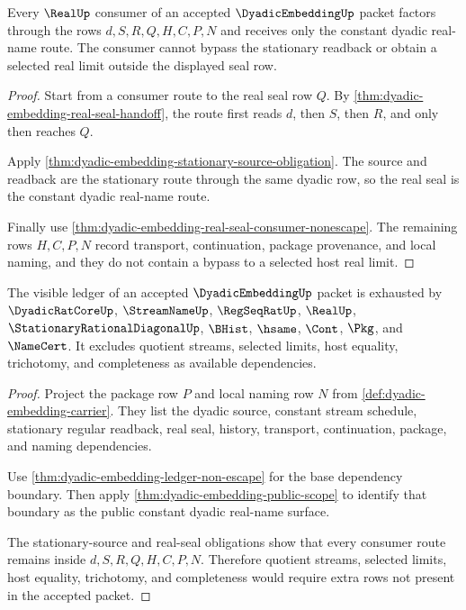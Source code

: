 \begin{theorem}
\label{thm:dyadic-embedding-real-seal-obligation}
Every $\RealUp$ consumer of an accepted $\DyadicEmbeddingUp$ packet factors through the rows $d,S,R,Q,H,C,P,N$ and receives only the constant dyadic real-name route. The consumer cannot bypass the stationary readback or obtain a selected real limit outside the displayed seal row.
\end{theorem}
\begin{proof}
Start from a consumer route to the real seal row $Q$. By \autoref{thm:dyadic-embedding-real-seal-handoff}, the route first reads $d$, then $S$, then $R$, and only then reaches $Q$.

Apply \autoref{thm:dyadic-embedding-stationary-source-obligation}. The source and readback are the stationary route through the same dyadic row, so the real seal is the constant dyadic real-name route.

Finally use \autoref{thm:dyadic-embedding-real-seal-consumer-nonescape}. The remaining rows $H,C,P,N$ record transport, continuation, package provenance, and local naming, and they do not contain a bypass to a selected host real limit.
\end{proof}

\begin{theorem}
\label{thm:dyadic-embedding-ledger-exactness-obligation}
The visible ledger of an accepted $\DyadicEmbeddingUp$ packet is exhausted by $\DyadicRatCoreUp$, $\StreamNameUp$, $\RegSeqRatUp$, $\RealUp$, $\StationaryRationalDiagonalUp$, $\BHist$, $\hsame$, $\Cont$, $\Pkg$, and $\NameCert$. It excludes quotient streams, selected limits, host equality, trichotomy, and completeness as available dependencies.
\end{theorem}
\begin{proof}
Project the package row $P$ and local naming row $N$ from \autoref{def:dyadic-embedding-carrier}. They list the dyadic source, constant stream schedule, stationary regular readback, real seal, history, transport, continuation, package, and naming dependencies.

Use \autoref{thm:dyadic-embedding-ledger-non-escape} for the base dependency boundary. Then apply \autoref{thm:dyadic-embedding-public-scope} to identify that boundary as the public constant dyadic real-name surface.

The stationary-source and real-seal obligations show that every consumer route remains inside $d,S,R,Q,H,C,P,N$. Therefore quotient streams, selected limits, host equality, trichotomy, and completeness would require extra rows not present in the accepted packet.
\end{proof}


